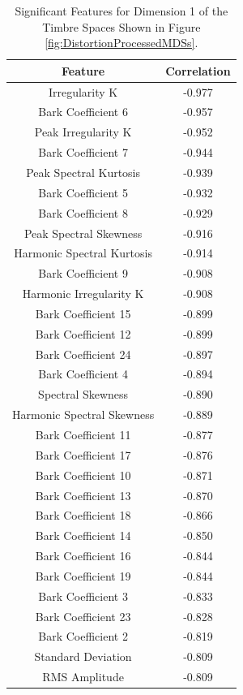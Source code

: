 		\begin{table}[h!]
			\centering
			\begin{tabular}{|c|c|}
				\hline
				\bf{Feature} & \bf{Correlation} \\
				\hline
				\hline
				Irregularity K & -0.977 \\
				\hline
				Bark Coefficient 6 & -0.957 \\
				\hline
				Peak Irregularity K & -0.952 \\
				\hline
				Bark Coefficient 7 & -0.944 \\
				\hline
				Peak Spectral Kurtosis & -0.939 \\
				\hline
				Bark Coefficient 5 & -0.932 \\
				\hline
				Bark Coefficient 8 & -0.929 \\
				\hline
				Peak Spectral Skewness & -0.916 \\
				\hline
				Harmonic Spectral Kurtosis & -0.914 \\
				\hline
				Bark Coefficient 9 & -0.908 \\
				\hline
				Harmonic Irregularity K & -0.908 \\
				\hline
				Bark Coefficient 15 & -0.899 \\
				\hline
				Bark Coefficient 12 & -0.899 \\
				\hline
				Bark Coefficient 24 & -0.897 \\
				\hline
				Bark Coefficient 4 & -0.894 \\
				\hline
				Spectral Skewness & -0.890 \\
				\hline
				Harmonic Spectral Skewness & -0.889 \\
				\hline
				Bark Coefficient 11 & -0.877 \\
				\hline
				Bark Coefficient 17 & -0.876 \\
				\hline
				Bark Coefficient 10 & -0.871 \\
				\hline
				Bark Coefficient 13 & -0.870 \\
				\hline
				Bark Coefficient 18 & -0.866 \\
				\hline
				Bark Coefficient 14 & -0.850 \\
				\hline
				Bark Coefficient 16 & -0.844 \\
				\hline
				Bark Coefficient 19 & -0.844 \\
				\hline
				Bark Coefficient 3 & -0.833 \\
				\hline
				Bark Coefficient 23 & -0.828 \\
				\hline
				Bark Coefficient 2 & -0.819 \\
				\hline
				Standard Deviation & -0.809 \\
				\hline
				RMS Amplitude & -0.809 \\
				\hline
			\end{tabular}
			\caption{Significant Features for Dimension 1 of the Timbre Spaces Shown in Figure 
				 \ref{fig:DistortionProcessedMDSs}.}
			\label{tab:DistortionProcessedFeaturesDim1}
		\end{table}

